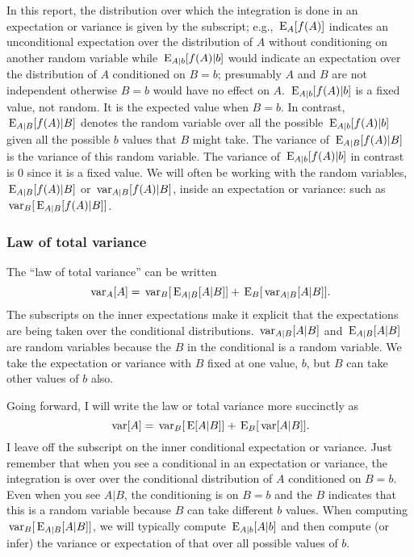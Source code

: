 \documentclass[]{article}
\def\E{\,\textup{\textrm{E}}}
\def\var{\,\textup{\textrm{var}}}
\begin{document}
In this report, the distribution over which the integration is done in an expectation or variance  is given by the subscript; e.g., $\E_A[f(A)]$ indicates an unconditional expectation over the distribution of $A$ without conditioning on another random variable while $\E_{A|b}[f(A)|b]$ would indicate an expectation over the distribution of $A$ conditioned on $B=b$; presumably $A$ and $B$ are not independent otherwise $B=b$ would have no effect on $A$. $\E_{A|b}[f(A)|b]$ is a fixed value, not random. It is the expected value when $B=b$. In contrast, $\E_{A|B}[f(A)|B]$ denotes the random variable over all the possible $\E_{A|b}[f(A)|b]$ given all the possible $b$ values that $B$ might take. The variance of $\E_{A|B}[f(A)|B]$ is the variance of this random variable. The variance of $\E_{A|b}[f(A)|b]$ in contrast is 0 since it is a fixed value.  We will often be working with the random variables, $\E_{A|B}[f(A)|B]$ or $\var_{A|B}[f(A)|B]$, inside an expectation or variance: such as $\var_B[\E_{A|B}[f(A)|B]]$.

\subsubsection{Law of total variance}

The ``law of total variance'' can be written
\begin{equation}\label{eq:lawoftotvar}
\var_A[A] = \var_B[\E_{A|B}[A|B]] + \E_B[\var_{A|B}[A|B]] .
\end{equation}
The subscripts on the inner expectations make it explicit that the expectations are being taken over the conditional distributions.  $\var_{A|B}[A|B]$ and $\E_{A|B}[A|B]$ are random variables because the $B$ in the conditional is a random variable. We take the expectation or variance with $B$ fixed at one value, $b$, but $B$ can take other values of $b$ also.  

Going forward, I will write the law or total variance more succinctly as
\begin{equation}
\var[A] = \var_B[\E[A|B]] + \E_B[\var[A|B]] .
\end{equation}
I leave off the subscript on the inner conditional expectation or variance. Just remember that when you see a conditional in an expectation or variance, the integration is over over the conditional distribution of $A$ conditioned on $B=b$. Even when you see $A|B$, the conditioning is on $B=b$ and the $B$ indicates that this is a random variable because $B$ can take different $b$ values. When computing $\var_B[\E_{A|B}[A|B]]$, we will typically compute $\E_{A|b}[A|b]$ and then compute (or infer) the variance or expectation of that over all possible values of $b$. 
\end{document}
